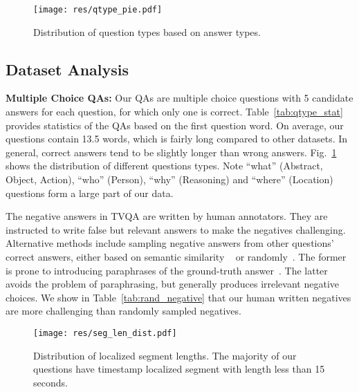 \documentclass[11pt,a4paper]{article}
\begin{document}
\begin{figure}[t]
  \texttt{[image: res/qtype\_pie.pdf]}
  \vspace{-20pt}
  \caption{Distribution of question types based on answer types.}
  \label{fig:qtype_pie}
  \vspace{-4pt}
\end{figure} 
 
 

\subsection{Dataset Analysis}


\textbf{Multiple Choice QAs:} Our QAs are multiple choice questions with 5 candidate answers for each question, for which only one is correct. 
Table~\ref{tab:qtype_stat} provides statistics of the QAs based on the first question word. On average, our questions contain 13.5 words, which is fairly long compared to other datasets. In general, correct answers tend to be slightly longer than wrong answers. 
Fig.~\ref{fig:qtype_pie} shows the distribution of different questions types.
Note ``what'' (Abstract, Object, Action), ``who'' (Person), ``why'' (Reasoning) and ``where'' (Location) questions form a large part of our data.

The negative answers in TVQA are written by human annotators. They are instructed to write false but relevant answers to make the negatives challenging. 
Alternative methods include sampling negative answers from other questions' correct answers, either based on semantic similarity ~\citep{Das2017VisualD, Jang2017TGIFQATS} or randomly~\citep{Antol2015VQAVQ, Das2017VisualD}. 
The former is prone to introducing paraphrases of the ground-truth answer~\citep{zhu2016visual7w}.  The latter avoids the problem of paraphrasing, but generally produces irrelevant negative choices. We show in Table~\ref{tab:rand_negative} that our human written negatives are more challenging than randomly sampled negatives.


\begin{figure}[ht]
\centering
  \texttt{[image: res/seg\_len\_dist.pdf]}
  \vspace{-10pt}
  \caption{Distribution of localized segment lengths. The majority of our questions have timestamp localized segment with length less than 15 seconds.}
  \label{fig:ts_len_dist}
\end{figure}
\end{document}
